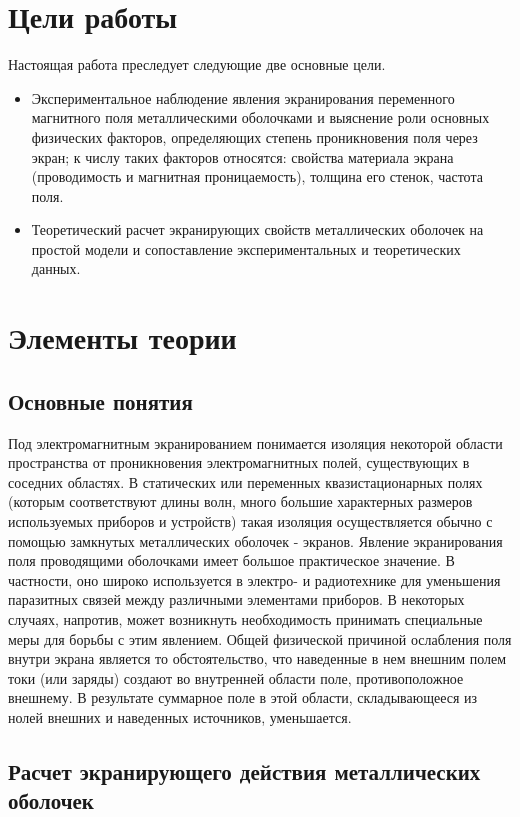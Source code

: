 \documentclass[a4paper,12pt]{article}
\begin{document}
\newpage

\section{Цели работы}
Настоящая работа преследует следующие две основные цели.
\begin{itemize}
	\item Экспериментальное наблюдение явления экранирования переменного магнитного поля металлическими оболочками и выяснение роли основных физических факторов, определяющих степень проникновения поля через экран; к числу таких факторов относятся: свойства материала экрана (проводимость и магнитная проницаемость), толщина его стенок, частота поля.
	\item Теоретический расчет экранирующих свойств металлических оболочек на простой модели и сопоставление экспериментальных и теоретических данных.
\end{itemize}
\section{Элементы теории}
\subsection{Основные понятия}
Под электромагнитным экранированием понимается изоляция некоторой области пространства от проникновения электромагнитных полей, существующих в соседних областях. В статических или переменных квазистационарных полях (которым соответствуют длины волн, много большие характерных размеров используемых приборов и устройств) такая изоляция осуществляется обычно с помощью замкнутых металлических оболочек - экранов. Явление экранирования поля проводящими оболочками имеет большое практическое значение. В частности, оно широко используется в электро- и радиотехнике для уменьшения паразитных связей между различными элементами приборов. В некоторых случаях, напротив, может возникнуть необходимость принимать специальные меры для борьбы с этим явлением.
Общей физической причиной ослабления поля внутри 
экрана является то обстоятельство, что наведенные в нем внешним полем токи (или заряды) создают во внутренней области поле, противоположное внешнему. В результате суммарное поле в этой области, складывающееся из нолей внешних и наведенных источников, уменьшается.

\subsection{Расчет экранирующего действия металлических
оболочек}
\end{document}
